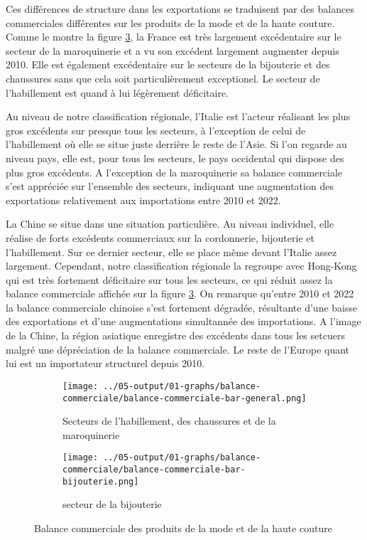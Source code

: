 \documentclass[french,10pt,a4paper]{article}
\begin{document}
Ces différences de structure dans les exportations se traduisent par des balances commerciales différentes sur les produits de la mode et de la haute couture. Comme le montre la figure \ref{fig:balance-commerciale}, la France est très largement excédentaire sur le secteur de la maroquinerie et a vu son excédent largement augmenter depuis 2010. Elle est également excédentaire sur le secteurs de la bijouterie et des chaussures sans que cela soit particulièrement exceptionel. Le secteur de l'habillement est quand à lui légèrement déficitaire.

Au niveau de notre classification régionale, l'Italie est l'acteur réalisant les plus gros excédents sur presque tous les secteurs, à l'exception de celui de l'habillement où elle se situe juste derrière le reste de l'Asie. Si l'on regarde au niveau pays, elle est, pour tous les secteurs, le pays occidental qui dispose des plus gros excédents. A l'exception de la maroquinerie sa balance commerciale s'est appréciée sur l'ensemble des secteurs, indiquant une augmentation des exportations relativement aux importations entre 2010 et 2022.

La Chine se situe dans une situation particulière. Au niveau individuel, elle réalise de forts excédents commerciaux sur la cordonnerie, bijouterie et l'habillement. Sur ce dernier secteur, elle se place même devant l'Italie assez largement. Cependant, notre classification régionale la regroupe avec Hong-Kong qui est très fortement déficitaire sur tous les secteurs, ce qui réduit assez la balance commerciale affichée sur la figure \ref{fig:balance-commerciale}. On remarque qu'entre 2010 et 2022 la balance commerciale chinoise s'est fortement dégradée, résultante d'une baisse des exportations et d'une augmentations simultannée des importations. A l'image de la Chine, la région asiatique enregistre des excédents dans tous les setcuers malgré une dépréciation de la balance commerciale. Le reste de l'Europe quant lui est un importateur structurel depuis 2010. 

\begin{figure}[!h]
  \centering
  \begin{subfigure}{\textwidth}
    \centering    
    \texttt{[image: ../05-output/01-graphs/balance-commerciale/balance-commerciale-bar-general.png]}
    \caption{Secteurs de l'habillement, des chaussures et de la maroquinerie}
    \label{fig:balance-commerciale-bar-general}
  \end{subfigure}
  \vspace{0.5cm}
  \begin{subfigure}{\textwidth}
    \centering \texttt{[image: ../05-output/01-graphs/balance-commerciale/balance-commerciale-bar-bijouterie.png]}
 \caption{secteur de la bijouterie}
 \label{fig:balance-commerciale-bar-bijouterie}
  \end{subfigure}
  \caption{Balance commerciale des produits de la mode et de la haute couture}
  \label{fig:balance-commerciale}
\end{figure}
\end{document}
